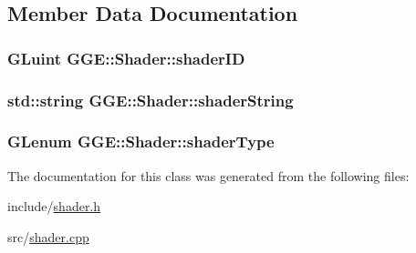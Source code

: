 \subsection{Member Data Documentation}
\hypertarget{class_g_g_e_1_1_shader_a8ae56489b492426e188fecb1cc3eb679}{
\subsubsection[{shader\+I\+D}]{\setlength{\rightskip}{0pt plus 5cm}G\+Luint G\+G\+E\+::\+Shader\+::shader\+I\+D\hspace{0.3cm}{\ttfamily [private]}}}\label{class_g_g_e_1_1_shader_a8ae56489b492426e188fecb1cc3eb679}
\hypertarget{class_g_g_e_1_1_shader_ad5e9d91f6cf959482b669d8fbf7712a4}{
\subsubsection[{shader\+String}]{\setlength{\rightskip}{0pt plus 5cm}std\+::string G\+G\+E\+::\+Shader\+::shader\+String\hspace{0.3cm}{\ttfamily [private]}}}\label{class_g_g_e_1_1_shader_ad5e9d91f6cf959482b669d8fbf7712a4}
\hypertarget{class_g_g_e_1_1_shader_a26f6e14c6c17ad9272adfa507616f325}{
\subsubsection[{shader\+Type}]{\setlength{\rightskip}{0pt plus 5cm}G\+Lenum G\+G\+E\+::\+Shader\+::shader\+Type\hspace{0.3cm}{\ttfamily [private]}}}\label{class_g_g_e_1_1_shader_a26f6e14c6c17ad9272adfa507616f325}


The documentation for this class was generated from the following files\+:\begin{DoxyCompactItemize}
\item 
include/\hyperlink{shader_8h}{shader.\+h}\item 
src/\hyperlink{shader_8cpp}{shader.\+cpp}\end{DoxyCompactItemize}
